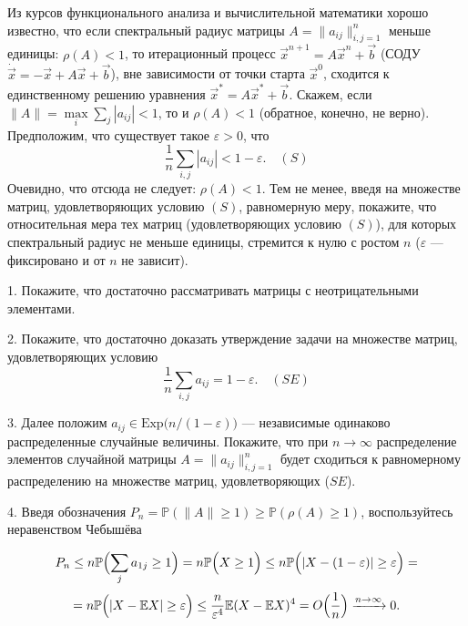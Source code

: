 \begin{problem}
Из курсов функционального анализа и вычислительной математики хорошо известно, что если спектральный радиус матрицы 
$A=\| a_{ij}\|_{i,j=1}^{n}$ меньше единицы: $\rho(A)<1$, то итерационный процесс ${\vec x}^{n+1}=A{\vec x}^n +{\vec b}$ 
(СОДУ $\dot{\vec x}=-{\vec x}+A{\vec x}+{\vec b}$), вне зависимости от точки старта ${\vec x}^0$, 
сходится к единственному решению уравнения ${\vec x}^*=A{\vec x}^*+{\vec b}$. 
Скажем, если $\| A\|=\max\limits_{i} \sum\limits_j |a_{ij}|<1$, то и $\rho(A)<1$ (обратное, конечно, не верно). Предположим, что 
существует такое $\varepsilon>0$, что 
$$
\frac{1}{n}\sum\limits_{i,j} |a_{ij}|<1-\varepsilon . 
\quad (S)
$$
Очевидно, что отсюда не следует: $\rho(A)<1$. 
Тем не менее, введя на множестве матриц, удовлетворяющих условию $(S)$, равномерную меру, покажите, что относительная мера тех матриц 
(удовлетворяющих условию $(S)$), для которых спектральный радиус не меньше единицы, стремится к нулю 
с ростом $n$ ($\varepsilon$ --- фиксировано и от $n$ не зависит). 
\end{problem}
\begin{ordre}

1. Покажите, что  достаточно рассматривать матрицы с неотрицательными элементами. 

2.  Покажите, что достаточно доказать утверждение задачи на множестве матриц, удовлетворяющих условию 
$$
\frac{1}{n}\sum\limits_{i,j} a_{ij}=1-\varepsilon . 
\quad (SE)
$$

3. Далее положим $a_{ij}\in \mathrm{Exp} \bigl( n/(1-\varepsilon)\bigr)$ --- независимые одинаково распределенные случайные величины. Покажите, что при $n\to\infty$ распределение элементов случайной матрицы $A=\| a_{ij}\|_{i,j=1}^n$ 
будет сходиться к равномерному распределению на множестве матриц, удовлетворяющих ($SE$). 

4. Введя обозначения
$P_n={\mathbb P}(\| A\|\ge 1)\ge {\mathbb P}(\rho(A)\ge 1)$, воспользуйтесь неравенством Чебышёва

$$
P_n\le n {\mathbb P}\Bigl( \sum\limits_j a_{1j}\ge 1 \Bigr)=n {\mathbb P}\Bigl( X\ge 1 \Bigr)\le 
n {\mathbb P}\Bigl( |X-(1-\varepsilon)|\ge \varepsilon \Bigr)=
$$
$$
=n {\mathbb P}\Bigl( |X-{\mathbb E}X|\ge \varepsilon \Bigr)\le \frac{n}{\varepsilon^4} {\mathbb E}(X-{\mathbb E}X)^4=
O\Bigl(\frac{1}{n}\Bigr) \xrightarrow{n\to\infty} 0 . 
$$
\end{ordre}





